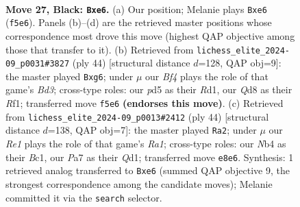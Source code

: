\documentclass[11pt]{article}
\begin{document}
\begin{figure}[p]\centering
\begin{subfigure}{0.46\textwidth}\centering
\resizebox{\linewidth}{!}{%
\newchessgame
\chessboard[
  setfen={r2qr3/ppp3k1/3bNpp1/3P1b1p/PnR5/2N3P1/RPP1QP1P/2B3K1 b - - 2 27},
  showmover=false,
  pgfstyle=straightmove, color=movearrow, markmove={f5-e6}
]}
\caption{}
\end{subfigure}\hfill
\begin{subfigure}{0.46\textwidth}\centering
\resizebox{\linewidth}{!}{%
\newchessgame
\chessboard[
  setfen={r3k2r/1p1n1p2/2qpb1p1/pN2p1Bp/Pn4P1/3B3P/1PP1QP2/1K1R1R2 w kq - 1 23},
  showmover=false,
  pgfstyle=straightmove, color=movearrow, markmove={d3-g6}
]}
\caption{}
\end{subfigure}
\\[4pt]
\begin{subfigure}{0.46\textwidth}\centering
\resizebox{\linewidth}{!}{%
\newchessgame
\chessboard[
  setfen={r3r1k1/1p3pp1/3p1q2/1p1Pnb2/P3n3/1Pp1RN1P/2B2PP1/R1BQ2K1 w - - 0 23},
  showmover=false,
  pgfstyle=straightmove, color=movearrow, markmove={a1-a2}
]}
\caption{}
\end{subfigure}\hfill

\caption{\textbf{Move 27, Black: \texttt{Bxe6}.} (a) Our position; Melanie plays \texttt{Bxe6} (\texttt{f5e6}). Panels (b)--(d) are the retrieved master positions whose correspondence most drove this move (highest QAP objective among those that transfer to it). (b) Retrieved from \texttt{lichess\_elite\_2024-09\_p0031\#3827} (ply 44) [structural distance $d$=128, QAP obj=9]: the master played \texttt{Bxg6}; under $\mu$ our \emph{Bf4} plays the role of that game's \emph{Bd3}; cross-type roles: our \emph{p}d5 as their \emph{R}d1, our \emph{Q}d8 as their \emph{R}f1; transferred move \texttt{f5e6} \textbf{(endorses this move)}. (c) Retrieved from \texttt{lichess\_elite\_2024-09\_p0013\#2412} (ply 44) [structural distance $d$=138, QAP obj=7]: the master played \texttt{Ra2}; under $\mu$ our \emph{Re1} plays the role of that game's \emph{Ra1}; cross-type roles: our \emph{N}b4 as their \emph{B}c1, our \emph{P}a7 as their \emph{Q}d1; transferred move \texttt{e8e6}. Synthesis: 1 retrieved analog transferred to \texttt{Bxe6} (summed QAP objective 9, the strongest correspondence among the candidate moves); Melanie committed it via the \texttt{search} selector.}
\label{fig:thought-m53}
\end{figure}

\clearpage
\end{document}
